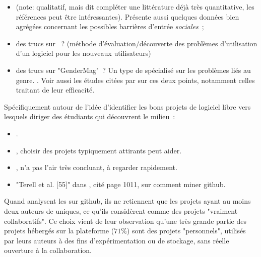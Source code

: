 \begin{itemize}
    \item {} (note: qualitatif, mais dit compléter une littérature déjà très
        quantitative, les références peut être intéressantes). Présente aussi quelques données bien agrégées
        concernant les possibles barrières d'entrée \emph{sociales} ;
    \item des trucs sur  ? (méthode  d'évaluation/découverte des
        problèmes d'utilisation d'un logiciel pour les nouveaux utilisateurs)
    \item des trucs sur "GenderMag" ? Un type de  spécialisé sur les problèmes liés
        au genre. . Voir aussi les études citées par
        \textcite[p.~1005-1006]{barriers-2018} sur ces deux points, notamment celles traitant de leur
        efficacité.
\end{itemize}

Spécifiquement autour de l'idée d'identifier les bons projets de logiciel libre vers lesquels diriger des
étudiants qui découvrent le milieu :

\begin{itemize}
    \item {}.
    \item {}, choisir des projets typiquement attirants peut aider.
    \item {}, n'a pas l'air très concluant, à regarder rapidement.
    \item "Terell et al. [55]" dans \textcite{barriers-2018}, cité page 1011, sur comment miner \gls{github}.
\end{itemize}

Quand  analysent les  sur \gls{github}, ils ne
retiennent que les projets ayant au moins deux auteurs de  uniques, ce qu'ils considèrent comme
des projets "vraiment collaboratifs". Ce choix vient de leur observation qu'une très grande partie des projets
hébergés sur la plateforme ($71\%$) sont des projets "personnels", utilisés par leurs auteurs à des fins
d'expérimentation ou de stockage, sans réelle ouverture à la collaboration.

